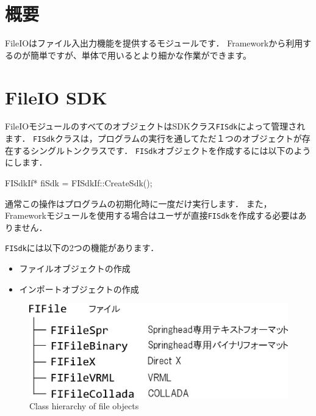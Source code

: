 %

\section{\KLUDGE 概要}

FileIO\KLUDGE はファイル入出力機能を提供するモジュールです．
Framework\KLUDGE から利用するのが簡単ですが、単体で用いるとより細かな作業ができます。

\section{FileIO SDK}

FileIO\KLUDGE モジュールのすべてのオブジェクトはSDK\KLUDGE クラス\texttt{FISdk}\KLUDGE によって管理されます．
\texttt{FISdk}\KLUDGE クラスは，プログラムの実行を通してただ１つのオブジェクトが存在するシングルトンクラスです．
\texttt{FISdk}\KLUDGE オブジェクトを作成するには以下のようにします．
\begin{sourcecode}
FISdkIf* fiSdk = FISdkIf::CreateSdk();
\end{sourcecode}
\KLUDGE 通常この操作はプログラムの初期化時に一度だけ実行します．
\KLUDGE また，Framework\KLUDGE モジュールを使用する場合はユーザが直接\texttt{FISdk}\KLUDGE を作成する必要はありません．

\texttt{FISdk}\KLUDGE には以下の2\KLUDGE つの機能があります．
\begin{itemize}
\item \KLUDGE ファイルオブジェクトの作成
\item \KLUDGE インポートオブジェクトの作成
\end{itemize}

\begin{figure}[t]
\begin{center}
\includegraphics[width=.6\hsize]{fig/fifile.eps}
\end{center}
\caption{Class hierarchy of file objects}
\label{fig_fifile}
\end{figure}

